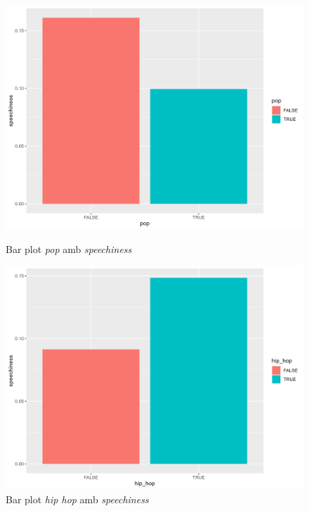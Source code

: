 \begin{figure}[H]
\centering
    \begin{minipage}{.4\textwidth}
        \centering
        \includegraphics[width=0.95\linewidth]{Images/2_Bivariate/popspeech.png}
        \caption{Bar plot \textit{pop} amb \textit{speechiness}}
        \label{fig:BivariateR_speechpop}
    \end{minipage}%
    \begin{minipage}{.4\textwidth}
        \centering
        \includegraphics[width=0.95\linewidth]{Images/2_Bivariate/hiphopspeech.png}
        \caption{Bar plot \textit{hip hop} amb \textit{speechiness}}
        \label{fig:BivariateR_speechhip}
    \end{minipage}%
\end{figure}

